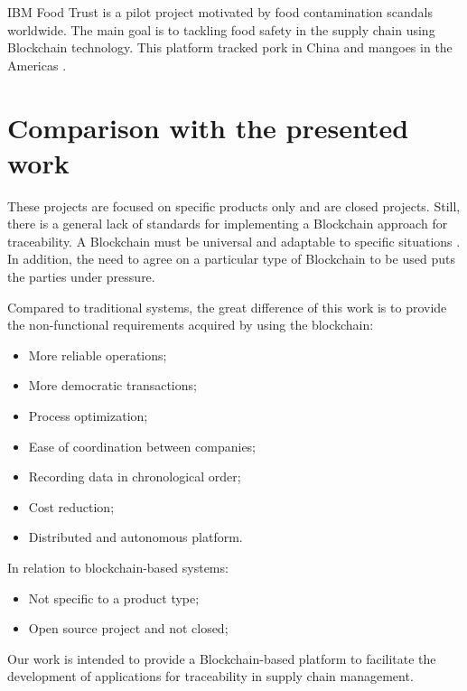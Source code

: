 IBM Food Trust is a pilot project motivated by food contamination scandals worldwide. The main goal is to tackling food safety in the supply chain using Blockchain technology. This platform tracked pork in China and mangoes in the Americas \cite{kamath2018food}.

\section{Comparison with the presented work} \label{sec:Comparison}
These projects are focused on specific products only and are closed projects. Still, there is a general lack of standards for implementing a Blockchain approach for traceability. A Blockchain must be universal and adaptable to specific situations \cite{valenta2017comparison}. In addition, the need to agree on a particular type of Blockchain to be used puts the parties under pressure. 

Compared to traditional systems, the great difference of this work is to provide the non-functional requirements acquired by using the blockchain:

\begin{itemize}
\item More reliable operations;
\item More democratic transactions;
\item Process optimization;
\item Ease of coordination between companies;
\item Recording data in chronological order;
\item Cost reduction;
\item Distributed and autonomous platform.
\end{itemize}

In relation to blockchain-based systems:

\begin{itemize}
\item Not specific to a product type;
\item Open source project and not closed;
\end{itemize}

Our work is intended to provide a Blockchain-based platform to facilitate the development of applications for traceability in supply chain management.

